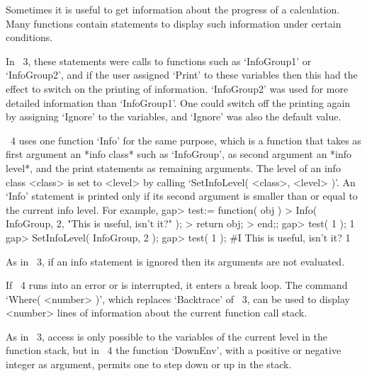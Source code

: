 
Sometimes it is useful to get information about the progress of a
calculation.
Many {\GAP} functions contain statements to display such information
under certain conditions.

In {\GAP}~3, these statements were calls to functions such as
`InfoGroup1' or `InfoGroup2', and if the user assigned `Print' to
these variables then this had the effect to switch on the printing of
information.
`InfoGroup2' was used for more detailed information than `InfoGroup1'.
One could switch off the printing again by assigning `Ignore' to the
variables, and `Ignore' was also the default value.

{\GAP}~4 uses one function `Info' for the same purpose,
which is a function that takes as first argument an *info class* such as
`InfoGroup', as second argument an *info level*, and the print statements
as remaining arguments.
The level of an info class <class> is set to <level> by calling
`SetInfoLevel( <class>, <level> )'.
An `Info' statement is printed only if its second argument is smaller than
or equal to the current info level.
For example,
\beginexample
gap> test:= function( obj )
> Info( InfoGroup, 2, "This is useful, isn't it?" );
> return obj;
> end;;
gap> test( 1 );
1
gap> SetInfoLevel( InfoGroup, 2 );
gap> test( 1 );
#I  This is useful, isn't it?
1
\endexample

As in {\GAP}~3, if an info statement is ignored then its arguments are
not evaluated.



If {\GAP}~4 runs into an error or is interrupted,
it enters a break loop.
The command `Where( <number> )', which replaces `Backtrace' of {\GAP}~3,
can be used to display <number> lines of information about the current
function call stack.

As in {\GAP}~3, access is only possible to the variables of the current
level in the function stack,
but in {\GAP}~4 the function `DownEnv', with a positive or negative
integer as argument, permits one to step down or up in the
stack.

